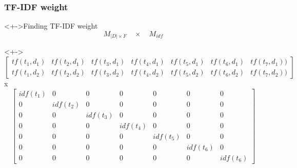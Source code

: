 \documentclass[serif,11pt,aspectratio=1610,table]{beamer}
\begin{document}
\begin{frame}[fragile]
 \frametitle{TF-IDF weight}
\begin{block}<+->{Finding TF-IDF weight}
 \begin{displaymath}
  M_{|D|  \times F } \quad \times \quad M_{idf}
 \end{displaymath}

\end{block}
\begin{block}<+->{}
 \footnotesize
 \begin{displaymath}
  \begin{bmatrix}
 tf(t_{1},d_{1}) & tf(t_{2},d_{1}) & tf(t_{3},d_{1}) & tf(t_{4},d_{1}) & tf(t_{5},d_{1}) & tf(t_{6},d_{1}) & tf(t_{7},d_{1}) ) \\

 tf(t_{1},d_{2}) & tf(t_{2},d_{2}) & tf(t_{3},d_{2}) & tf(t_{4},d_{2}) & tf(t_{5},d_{2}) & tf(t_{6},d_{2}) & tf(t_{7},d_{2}))
  \end{bmatrix}
  \end{displaymath}
 x
  \footnotesize
\begin{displaymath}
  \begin{bmatrix}
   idf(t_{1}) & 0 & 0 & 0 & 0 & 0 & 0 \\

   0 & idf(t_{2}) & 0 & 0 & 0 & 0 & 0 \\

   0 & 0 & idf(t_{3}) & 0 & 0 & 0 & 0 \\

   0 & 0 & 0 & idf(t_{4}) & 0 & 0 & 0 \\

   0 & 0 & 0 & 0 & idf(t_{5}) & 0 & 0 \\
   
   0 & 0 & 0 & 0 & 0 & idf(t_{6}) & 0 \\
   
   0 & 0 & 0 & 0 & 0 & 0 & idf(t_{6})
  \end{bmatrix}
\end{displaymath}


\end{block}

\end{frame}
\end{document}
